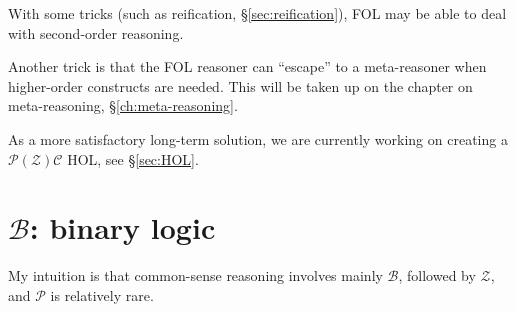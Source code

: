 With some tricks (such as reification, \S\ref{sec:reification}), FOL may be able to deal with second-order reasoning.

Another trick is that the FOL reasoner can ``escape'' to a meta-reasoner when higher-order constructs are needed.  This will be taken up on the chapter on meta-reasoning, \S\ref{ch:meta-reasoning}.

As a more satisfactory long-term solution, we are currently working on creating a $\mathcal{P(Z)C}$ HOL, see \S\ref{sec:HOL}.


\section{$\mathcal{B}$: binary logic}
\label{sec:binary-logic}

My intuition is that common-sense reasoning involves mainly $\mathcal{B}$, followed by $\mathcal{Z}$, and $\mathcal{P}$ is relatively rare.





